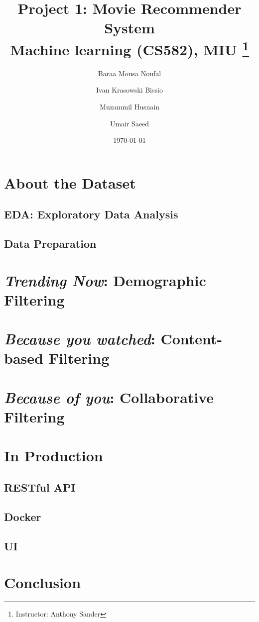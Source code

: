 \documentclass[titlepage, 11pt]{article}
\title{
	\textbf{Project 1: Movie Recommender System} \\
	Machine learning (CS582), MIU \thanks{Instructor: Anthony Sander}
}
\author{
    Baraa Mousa Noufal \and Ivan Krasowski Bissio
        \and Muzammil Husnain \and Umair Saeed
}
\date{\today}
\begin{document}
\maketitle
\tableofcontents

\begin{abstract}
	
\end{abstract}

\section{About the Dataset}

\subsection{EDA: Exploratory Data Analysis}


\subsection{Data Preparation}


\section{\emph{Trending Now}: Demographic Filtering}


\section{\emph{Because you watched}: Content-based Filtering}


\section{\emph{Because of you}: Collaborative Filtering}


\section{In Production}
\subsection{RESTful API}

\subsection{Docker}

\subsection{UI}


\section{Conclusion}

\end{document}
